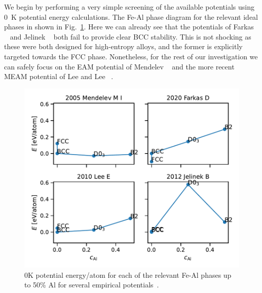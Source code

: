 We begin by performing a very simple screening of the available potentials using 0~K potential energy calculations.
The Fe-Al phase diagram for the relevant ideal phases in shown in Fig.~\ref{fig:0K_phases}.
Here we can already see that the potentials of Farkas \etal~\cite{farkas2020model} and Jelinek \etal~\cite{jelinek2012modified} both fail to provide clear BCC stability.
This is not shocking as these were both designed for high-entropy alloys, and the former is explicitly targeted towards the FCC phase.
Nonetheless, for the rest of our investigation we can safely focus on the EAM potential of Mendelev \etal~\cite{mendelev2005effect} and the more recent MEAM potential of Lee and Lee \etal~\cite{lee2010modified}.
%
\begin{figure}[h]
    \centering
    \includegraphics[width=\textwidth]{figures/zerok_phases}
    \caption{0K potential energy/atom for each of the relevant Fe-Al phases up to 50\% Al for several empirical potentials~\cite{mendelev2005effect, lee2010modified, jelinek2012modified, farkas2020model}.}
    \label{fig:0K_phases}
\end{figure}

